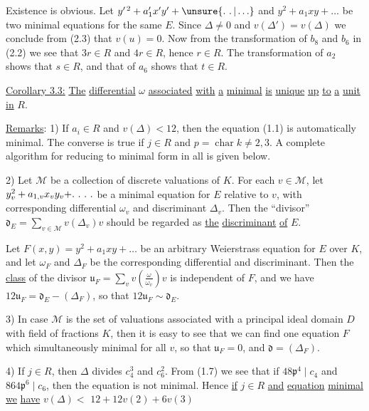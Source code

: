 Existence is obvious. Let $y^{\prime\,2}+a_1'x'y'+\unsure{\ldotp\,\ldotp|\ldots}$ and $y^2+a_1xy+\ldots$ be two minimal equations for the same $E$. Since $\Delta\ne0$ and $v(\Delta')=v(\Delta)$ we conclude from (2.3) that $v(u)=0$. Now from the transformation of $b_8$ and $b_6$ in (2.2) we see that $3r\in R$ and $4r\in R$, hence $r\in R$.  The transformation of $a_2$ shows that $s\in R$, and that of $a_6$ shows that $t\in R$.

\uline{Corollary 3.3:} \uline{The} \uline{differential} $\omega$ \uline{associated} \uline{with} \uline{a} \uline{minimal}  \uline{is} \uline{unique} \uline{up} \uline{to} \uline{a} \uline{unit} \uline{in} $R$.

\uline{Remarks}: 1) If $a_i\in R$ and $v(\Delta)<12$, then the equation (1.1) is automatically minimal. The converse is true if $j\in R$ and $p=\operatorname{char}k\ne2,3$. A complete algorithm for reducing to minimal form in all  is given below.

2) Let $\mathscr{M}$ be a collection of discrete valuations of $K$. For each $v\in\mathscr{M}$, let $y_v^2+a_{1,v}x_vy_v+\ldotp\,\ldotp\,\ldotp\,\ldotp$ be a minimal equation for $E$ relative to $v$, with corresponding differential $\omega_v$ and discriminant $\Delta_v$. Then the ``divisor'' $\displaystyle \mathfrak{d}_E=\sum_{v\in\mathscr{M}}v(\Delta_v)v$ should be regarded as \uline{the} \uline{discriminant} \uline{of} $E$.

Let $F(x,y)=y^2+a_1xy+\ldots$ be an arbitrary Weierstrass equation for $E$ over $K$, and let $\omega_F$ and $\Delta_F$ be the corresponding differential and discriminant. Then the \uline{class} of the divisor $\displaystyle \mathfrak{u}_F=\sum_v v\left(\frac{\omega}{\omega_v}\right)v$ is independent of $F$, and we have $12\mathfrak{u}_F=\mathfrak{d}_E-(\Delta_F)$, so that $12\mathfrak{u}_F\sim\mathfrak{d}_E$.

3) In case $\mathscr{M}$ is the set of valuations associated with a principal ideal domain $D$ with field of fractions $K$, then it is easy to see that we can find one equation $F$ which simultaneously minimal for all $v$, so that $\mathfrak{u}_F=0$, and $\mathfrak{d}=(\Delta_F)$.

4) If $j\in R$, then $\Delta$ divides $c_4^3$ and $c_6^2$. From (1.7) we see that if $48\mathfrak{p}^4\mid c_4$ and $864\mathfrak{p}^6\mid c_6$, then the equation is not minimal. Hence \uline{if} $j\in R$ \uline{and} \uline{equation} \uline{minimal} \uline{we} \uline{have} $v(\Delta)<$  $12+12v(2)+6v(3)$

